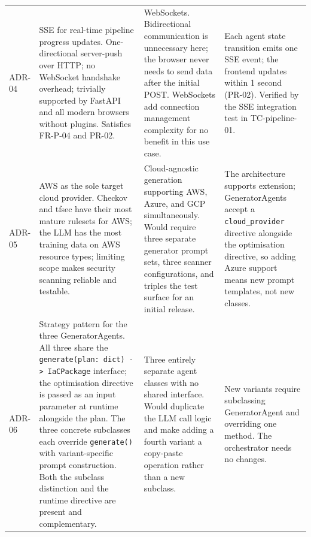 \begin{longtable}{@{}p{}p{}p{}p{}@{}}
ADR-04 &
  SSE for real-time pipeline progress updates. One-directional server-push
  over HTTP; no WebSocket handshake overhead; trivially supported by FastAPI
  and all modern browsers without plugins. Satisfies FR-P-04 and PR-02. &
  WebSockets. Bidirectional communication is unnecessary here; the browser
  never needs to send data after the initial POST. WebSockets add connection
  management complexity for no benefit in this use case. &
  Each agent state transition emits one SSE event; the frontend updates within
  1 second (PR-02). Verified by the SSE integration test in TC-pipeline-01. \\

ADR-05 &
  AWS as the sole target cloud provider. Checkov and tfsec have their most
  mature rulesets for AWS; the LLM has the most training data on AWS resource
  types; limiting scope makes security scanning reliable and testable. &
  Cloud-agnostic generation supporting AWS, Azure, and GCP simultaneously.
  Would require three separate generator prompt sets, three scanner
  configurations, and triples the test surface for an initial release. &
  The architecture supports extension; GeneratorAgents accept a
  \texttt{cloud\_provider} directive alongside the optimisation directive,
  so adding Azure support means new prompt templates, not new classes. \\

ADR-06 &
  Strategy pattern for the three GeneratorAgents. All three share the
  \texttt{generate(plan: dict) -> IaCPackage} interface; the optimisation
  directive is passed as an input parameter at runtime alongside the plan.
  The three concrete subclasses each override \texttt{generate()} with
  variant-specific prompt construction. Both the subclass distinction and
  the runtime directive are present and complementary. &
  Three entirely separate agent classes with no shared interface. Would
  duplicate the LLM call logic and make adding a fourth variant a copy-paste
  operation rather than a new subclass. &
  New variants require subclassing GeneratorAgent and overriding one method.
  The orchestrator needs no changes. \\

\bottomrule
\end{longtable}